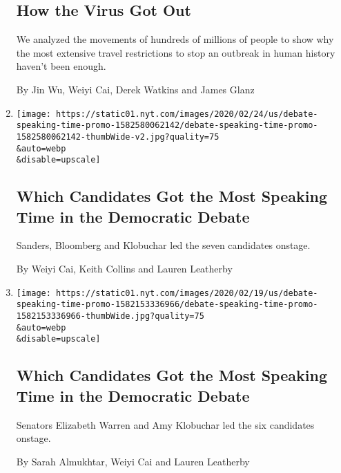 \begin{enumerate}
  \hypertarget{how-the-virus-got-out}{%
  \subsection{How the Virus Got Out}\label{how-the-virus-got-out}}

  We analyzed the movements of hundreds of millions of people to show
  why the most extensive travel restrictions to stop an outbreak in
  human history haven't been enough.

  By Jin Wu, Weiyi Cai, Derek Watkins and James Glanz
\item
  \href{/interactive/2020/02/25/us/elections/debate-speaking-time.html}{}

  \texttt{[image: https://static01.nyt.com/images/2020/02/24/us/debate-speaking-time-promo-1582580062142/debate-speaking-time-promo-1582580062142-thumbWide-v2.jpg?quality=75\\\&auto=webp\\\&disable=upscale]}

  \hypertarget{which-candidates-got-the-most-speaking-time-in-the-democratic-debate}{%
  \subsection{Which Candidates Got the Most Speaking Time in the
  Democratic
  Debate}\label{which-candidates-got-the-most-speaking-time-in-the-democratic-debate}}

  Sanders, Bloomberg and Klobuchar led the seven candidates onstage.

  By Weiyi Cai, Keith Collins and Lauren Leatherby
\item
  \href{/interactive/2020/02/19/us/elections/debate-speaking-time.html}{}

  \texttt{[image: https://static01.nyt.com/images/2020/02/19/us/debate-speaking-time-promo-1582153336966/debate-speaking-time-promo-1582153336966-thumbWide.jpg?quality=75\\\&auto=webp\\\&disable=upscale]}

  \hypertarget{which-candidates-got-the-most-speaking-time-in-the-democratic-debate-1}{%
  \subsection{Which Candidates Got the Most Speaking Time in the
  Democratic
  Debate}\label{which-candidates-got-the-most-speaking-time-in-the-democratic-debate-1}}

  Senators Elizabeth Warren and Amy Klobuchar led the six candidates
  onstage.

  By Sarah Almukhtar, Weiyi Cai and Lauren Leatherby
\end{enumerate}

